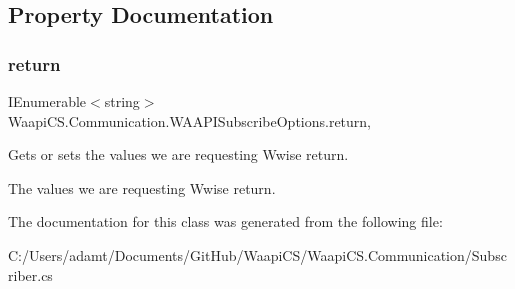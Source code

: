 \subsection{Property Documentation}
\mbox{\label{class_waapi_c_s_1_1_communication_1_1_w_a_a_p_i_subscribe_options_a2def35365ed52c59a777d0039c2fde60}} 
\subsubsection{\texorpdfstring{return}{return}}
{\footnotesize\ttfamily I\+Enumerable$<$string$>$ Waapi\+C\+S.\+Communication.\+W\+A\+A\+P\+I\+Subscribe\+Options.\+return\hspace{0.3cm}{\ttfamily [get]}, {\ttfamily [set]}}



Gets or sets the values we are requesting Wwise return. 

The values we are requesting Wwise return. 

The documentation for this class was generated from the following file\+:\begin{DoxyCompactItemize}
\item 
C\+:/\+Users/adamt/\+Documents/\+Git\+Hub/\+Waapi\+C\+S/\+Waapi\+C\+S.\+Communication/Subscriber.\+cs\end{DoxyCompactItemize}

